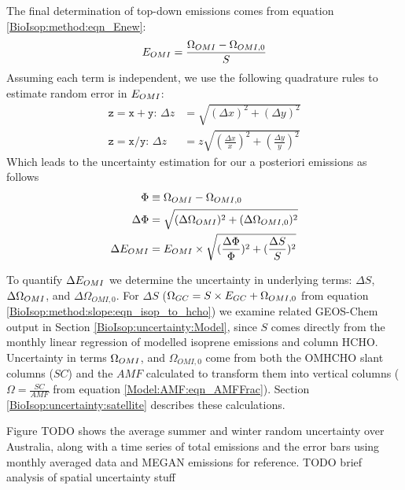     The final determination of top-down emissions comes from equation \ref{BioIsop:method:eqn_Enew}: 
    \begin{equation*}
      E_{OMI}=\frac{\Omega_{OMI} - \Omega_{OMI,0}}{S}
    \end{equation*}
    Assuming each term is independent, we use the following quadrature rules to estimate random error in $E_{OMI}$:
    \begin{align}
      \mathtt{z=x+y:} \, \Delta{z} & = \sqrt{(\Delta{x})^2 + (\Delta{y})^2} \\
      \mathtt{z=x/y:} \, \Delta{z} & = z \sqrt{(\frac{\Delta{x}}{x})^2 + (\frac{\Delta{y}}{y})^2} \label{BioIsop:uncertainty:eqn_quadrature_divide} 
    \end{align}
    Which leads to the uncertainty estimation for our a posteriori emissions as follows
    \begin{align}
      \Phi & \equiv \Omega_{OMI} - \Omega_{OMI,0}   \notag \\
      \Delta{\Phi} & = \sqrt{(\Delta{\Omega_{OMI}})^2 + (\Delta{\Omega_{OMI,0}})^2}  \label{BioIsop:uncertainty:eomi:eqn_delta_Phi} \\
      \Delta{E_{OMI}} &= E_{OMI} \times \sqrt{(\frac{\Delta{\Phi}}{\Phi})^2 + (\frac{\Delta{S}}{S})^2} \label{BioIsop:uncertainty:eomi:eqn_delta_apost}
    \end{align}
    
    To quantify $\Delta{E_{OMI}}$ we determine the uncertainty in underlying terms: $\Delta{S}$, $\Delta{\Omega_{OMI}}$, and $\Delta{\Omega_{OMI,0}}$. 
    For $\Delta{S}$ ($\Omega_{GC} = S \times E_{GC} + \Omega_{OMI,0}$ from equation \ref{BioIsop:method:slope:eqn_isop_to_hcho}) we examine related GEOS-Chem output in Section \ref{BioIsop:uncertainty:Model}, since $S$ comes directly from the monthly linear regression of modelled isoprene emissions and column HCHO.
    Uncertainty in terms $\Omega_{OMI}$, and $\Omega_{OMI,0}$ come from both the OMHCHO slant columns ($SC$) and the $AMF$ calculated to transform them into vertical columns ($\Omega = \frac{SC}{AMF}$ from equation \ref{Model:AMF:eqn_AMFFrac}).
    Section \ref{BioIsop:uncertainty:satellite} describes these calculations.
    
    
    Figure TODO shows the average summer and winter random uncertainty over Australia, along with a time series of total emissions and the error bars using monthly averaged data and MEGAN emissions for reference.
    TODO brief analysis of spatial uncertainty stuff
    
